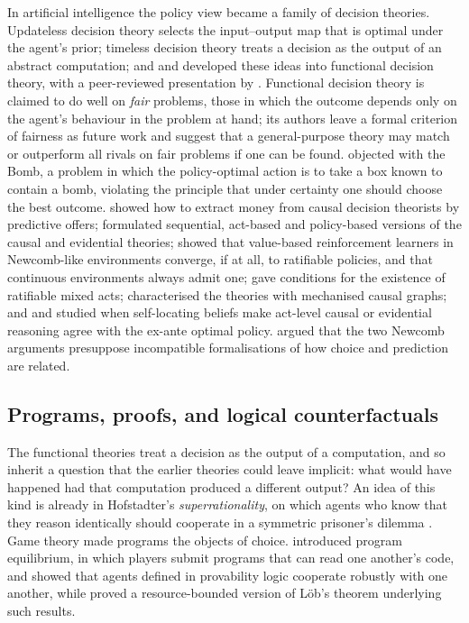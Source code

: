 In artificial intelligence the policy view became a family of decision theories.
Updateless decision theory \autocite{dai2009} selects the input--output map that is optimal under
the agent's prior; timeless decision theory \autocite{yudkowsky2010} treats a decision as the output
of an abstract computation; and \textcite{soaresfallenstein2015} and \textcite{yudkowskysoares2017}
developed these ideas into functional decision theory, with a peer-reviewed presentation by
\textcite{levinsteinsoares2020}. Functional decision theory is claimed to do well on \emph{fair}
problems, those in which the outcome depends only on the agent's behaviour in the problem at hand;
its authors leave a formal criterion of fairness as future work and suggest that a general-purpose
theory may match or outperform all rivals on fair problems if one can be found.
\textcite{macaskill2019} objected with the Bomb, a problem in which the policy-optimal action is to take
a box known to contain a bomb, violating the principle that under certainty one should choose the
best outcome. \textcite{oesterheldconitzer2021} showed how to extract money from causal decision
theorists by predictive offers; \textcite{everittetal2015} formulated sequential, act-based and
policy-based versions of the causal and evidential theories; \textcite{belletal2021} showed that
value-based reinforcement learners in Newcomb-like environments converge, if at all, to ratifiable
policies, and that continuous environments always admit one; \textcite{halpern2020} gave conditions for
the existence of ratifiable mixed acts; \textcite{macdermottetal2023} characterised the theories with
mechanised causal graphs; and \textcite{oesterheldconitzer2024dese} and \textcite{cooperetal2024}
studied when self-locating beliefs make act-level causal or evidential reasoning agree with the
ex-ante optimal policy. \textcite{wolpertbenford2013} argued that the two Newcomb arguments presuppose
incompatible formalisations of how choice and prediction are related.

\subsection{Programs, proofs, and logical counterfactuals}

The functional theories treat a decision as the output of a computation, and so inherit a question
that the earlier theories could leave implicit: what would have happened had that computation
produced a different output? An idea of this kind is already in Hofstadter's \emph{superrationality},
on which agents who know that they reason identically should cooperate in a symmetric prisoner's
dilemma \autocite{hofstadter1983}. Game theory made programs the objects of choice.
\textcite{tennenholtz2004} introduced program equilibrium, in which players submit programs that can
read one another's code, and \textcite{barasz2014} showed that agents defined in provability logic
cooperate robustly with one another, while \textcite{critch2019} proved a resource-bounded version of
Löb's theorem underlying such results.

